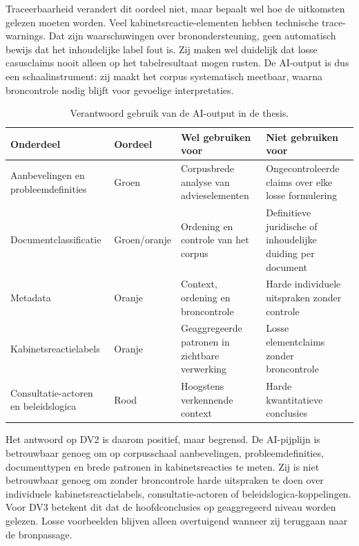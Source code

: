 \noindent Traceerbaarheid verandert dit oordeel niet, maar bepaalt wel hoe de
uitkomsten gelezen moeten worden. Veel kabinetsreactie-elementen hebben technische
trace-warnings. Dat zijn waarschuwingen over bronondersteuning, geen automatisch
bewijs dat het inhoudelijke label fout is. Zij maken wel duidelijk dat losse
casusclaims nooit alleen op het tabelresultaat mogen rusten. De AI-output is dus
een schaalinstrument: zij maakt het corpus systematisch meetbaar, waarna
broncontrole nodig blijft voor gevoelige interpretaties.

\begin{table}[htbp]
\centering
\caption{Verantwoord gebruik van de AI-output in de thesis.}
\label{tab:dv2-compact-gebruik}
\small
\begin{tabularx}{\textwidth}{@{}>{\raggedright\arraybackslash}p{3.0cm}
>{\raggedright\arraybackslash}p{2.2cm}
>{\raggedright\arraybackslash}X
>{\raggedright\arraybackslash}p{3.6cm}@{}}
\toprule
Onderdeel & Oordeel & Wel gebruiken voor & Niet gebruiken voor \\
\midrule
Aanbevelingen en probleemdefinities & Groen & Corpusbrede analyse van advieselementen & Ongecontroleerde claims over elke losse formulering \\
Documentclassificatie & Groen/oranje & Ordening en controle van het corpus & Definitieve juridische of inhoudelijke duiding per document \\
Metadata & Oranje & Context, ordening en broncontrole & Harde individuele uitspraken zonder controle \\
Kabinetsreactielabels & Oranje & Geaggregeerde patronen in zichtbare verwerking & Losse elementclaims zonder broncontrole \\
Consultatie-actoren en beleidslogica & Rood & Hoogstens verkennende context & Harde kwantitatieve conclusies \\
\bottomrule
\end{tabularx}
\end{table}

\noindent Het antwoord op DV2 is daarom positief, maar begrensd. De AI-pijplijn is
betrouwbaar genoeg om op corpusschaal aanbevelingen, probleemdefinities,
documenttypen en brede patronen in kabinetsreacties te meten. Zij is niet
betrouwbaar genoeg om zonder broncontrole harde uitspraken te doen over
individuele kabinetsreactielabels, consultatie-actoren of
beleidslogica-koppelingen. Voor DV3 betekent dit dat de hoofdconclusies op
geaggregeerd niveau worden gelezen. Losse voorbeelden blijven alleen overtuigend
wanneer zij teruggaan naar de bronpassage.
